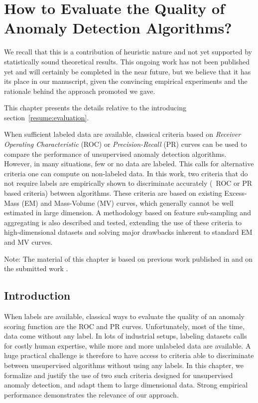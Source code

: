 \chapter{How to Evaluate the Quality of Anomaly Detection Algorithms?}
\label{chap:evaluation}

We recall that this is a contribution of heuristic nature and not yet supported by statistically sound theoretical results. This ongoing work has not been published yet and will certainly be completed in the near future, but we believe that it has its place in our manuscript, given the convincing empirical experiments and the rationale behind the approach promoted we gave.

\begin{chapabstract}
This chapter presents the details relative to the introducing section~\ref{resume:evaluation}.

When sufficient labeled data are available, classical criteria based on \emph{Receiver Operating Characteristic} (ROC) or \emph{Precision-Recall} (PR) curves can be used to compare the performance of unsupervised anomaly detection algorithms. However, in many situations, few or no data are labeled. This calls for alternative criteria one can compute on non-labeled data. In this work, two criteria that do not require labels are empirically shown to discriminate accurately (\wrt~ROC or PR based criteria) between algorithms. 
These criteria are based on existing Excess-Mass (EM) and Mass-Volume (MV) curves, which generally cannot be well estimated in large dimension.
A methodology based on feature sub-sampling and aggregating is also described and tested, extending the use of these criteria to high-dimensional datasets and solving major drawbacks inherent to standard EM and MV curves.
\end{chapabstract}

Note: The material of this chapter is based on previous work published in \cite{ICMLworkshop16} and on the submitted work \cite{NIPS16evaluation}.


\section{Introduction}
\label{evaluation:sec:intro}
When labels are available, classical ways to evaluate the quality of an anomaly scoring function are the ROC and PR curves.
Unfortunately, most of the time, data come without any label. In lots of industrial setups, labeling datasets calls for costly human expertise, while more and more unlabeled data are available.
A huge practical challenge is therefore to have access to criteria able to discriminate between unsupervised algorithms without using any labels. 
In this chapter, we formalize and justify the use of two such criteria designed for unsupervised anomaly detection, and adapt them to large dimensional data. Strong empirical performance demonstrates the relevance of our approach. %

